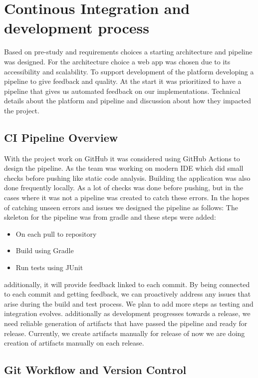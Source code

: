 \section{Continous Integration and development process}
Based on pre-study and requirements choices a starting architecture and pipeline was designed.
For the architecture choice a web app was chosen due to its accessibility and scalability.
To support development of the platform developing a pipeline to give feedback and quality. 
At the start it was prioritized to have a pipeline that gives us automated feedback on our implementations.
Technical details about the platform and pipeline and discussion about how they impacted the project. 

\subsection{CI Pipeline Overview}
With the project work on GitHub it was considered using GitHub Actions to design the pipeline.
As the team was working on modern IDE which did small checks before pushing like static code analysis.
Building the application was also done frequently locally. 
As a lot of checks was done before pushing, but in the cases where it was not a pipeline was created to catch these errors.
In the hopes of catching unseen errors and issues we designed the pipeline as follows: 
The skeleton for the pipeline was from gradle and these steps were added:
\begin{itemize}
  \item On each pull to repository
  \item Build using Gradle
  \item Run tests using JUnit
\end{itemize}
additionally, it will provide feedback linked to each commit.
By being connected to each commit and getting feedback, we can proactively address any issues that arise during the build and test process.
We plan to add more steps as testing and integration evolves.
additionally as development progresses towards a release, we need reliable generation of artifacts that have passed the pipeline and ready for release.
Currently, we create artifacts manually for release of now we are doing creation of artifacts manually on each release.

\subsection{Git Workflow and Version Control}

